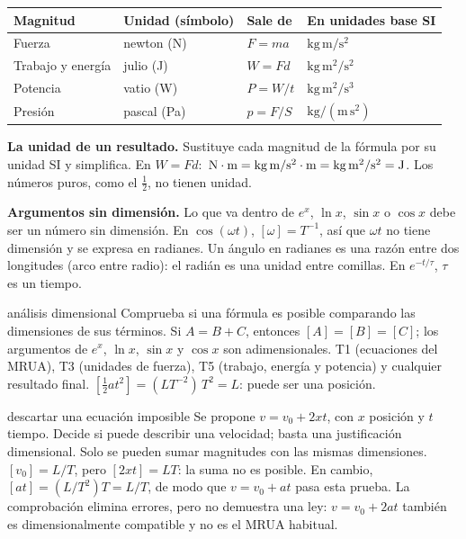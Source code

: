 \documentclass[11pt,a4paper]{article}
\begin{document}
\begin{tabularx}{\linewidth}{@{}>{\raggedright\arraybackslash}p{3.3cm}>{\raggedright\arraybackslash}p{3.3cm}>{\raggedright\arraybackslash}p{3.2cm}Y@{}}
\toprule
Magnitud & Unidad (s\'imbolo) & Sale de & En unidades base SI\\
\midrule
Fuerza & newton (N) & $F=ma$ & $\mathrm{kg\,m/s^2}$\\
Trabajo y energ\'ia & julio (J) & $W=Fd$ & $\mathrm{kg\,m^2/s^2}$\\
Potencia & vatio (W) & $P=W/t$ & $\mathrm{kg\,m^2/s^3}$\\
Presi\'on & pascal (Pa) & $p=F/S$ & $\mathrm{kg/(m\,s^2)}$\\
\bottomrule
\end{tabularx}

\textbf{La unidad de un resultado.} Sustituye cada magnitud de la f\'ormula por su
unidad SI y simplifica. En $W=Fd$:
$\,\mathrm{N}\cdot\mathrm{m}=\mathrm{kg\,m/s^2}\cdot\mathrm{m}=\mathrm{kg\,m^2/s^2}=\mathrm{J}$.
Los n\'umeros puros, como el $\tfrac12$, no tienen unidad.

\textbf{Argumentos sin dimensi\'on.} Lo que va dentro de $e^{x}$, $\ln x$, $\sin x$ o
$\cos x$ debe ser un n\'umero sin dimensi\'on. En $\cos(\omega t)$, $[\omega]=T^{-1}$,
as\'i que $\omega t$ no tiene dimensi\'on y se expresa en radianes.
Un \'angulo en radianes es una raz\'on entre dos longitudes (arco entre radio):
el radi\'an es una unidad \guillemotleft entre comillas\guillemotright. En $e^{-t/\tau}$, $\tau$ es un tiempo.

\begin{toolbox}{an\'alisis dimensional}
 Comprueba si una f\'ormula es posible comparando las dimensiones
de sus t\'erminos.
 Si $A=B+C$, entonces $[A]=[B]=[C]$; los argumentos de
$e^{x}$, $\ln x$, $\sin x$ y $\cos x$ son adimensionales.
 T1 (ecuaciones del MRUA), T3 (unidades de fuerza),
T5 (trabajo, energ\'ia y potencia) y cualquier resultado final.
 $[\tfrac12at^2]=(LT^{-2})\,T^2=L$: puede ser una posici\'on.
\end{toolbox}

\begin{examplebox}{descartar una ecuaci\'on imposible}
 Se propone $v=v_0+2xt$, con $x$ posici\'on y $t$ tiempo.
Decide si puede describir una velocidad; basta una justificaci\'on dimensional.
\solutionblock
{} Solo se pueden sumar magnitudes con las mismas dimensiones.
 $[v_0]=L/T$, pero $[2xt]=LT$: la suma no es posible.
En cambio, $[at]=(L/T^2)T=L/T$, de modo que $v=v_0+at$ pasa esta prueba.
 La comprobaci\'on elimina errores, pero no demuestra una ley:
$v=v_0+2at$ tambi\'en es dimensionalmente compatible y no es el MRUA habitual.
\end{examplebox}
\end{document}
